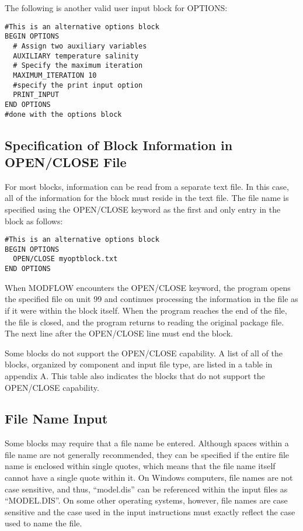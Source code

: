 \noindent The following is another valid user input block for OPTIONS:

\begin{lstlisting}[style=inputfile]
#This is an alternative options block
BEGIN OPTIONS
  # Assign two auxiliary variables
  AUXILIARY temperature salinity
  # Specify the maximum iteration
  MAXIMUM_ITERATION 10
  #specify the print input option
  PRINT_INPUT
END OPTIONS
#done with the options block
\end{lstlisting}

\subsection{Specification of Block Information in OPEN/CLOSE File} 
For most blocks, information can be read from a separate text file.  In this case, all of the information for the block must reside in the text file.  The file name is specified using the OPEN/CLOSE keyword as the first and only entry in the block as follows:

\begin{lstlisting}[style=inputfile]
#This is an alternative options block
BEGIN OPTIONS
  OPEN/CLOSE myoptblock.txt
END OPTIONS
\end{lstlisting}

\noindent When MODFLOW encounters the OPEN/CLOSE keyword, the program opens the specified file on unit 99 and continues processing the information in the file as if it were within the block itself.  When the program reaches the end of the file, the file is closed, and the program returns to reading the original package file.  The next line after the OPEN/CLOSE line must end the block.

Some blocks do not support the OPEN/CLOSE capability.  A list of all of the blocks, organized by component and input file type, are listed in a table in appendix A.  This table also indicates the blocks that do not support the OPEN/CLOSE capability.

\subsection{File Name Input}
Some blocks may require that a file name be entered.  Although spaces within a file name are not generally recommended, they can be specified if the entire file name is enclosed within single quotes, which means that the file name itself cannot have a single quote within it.  On Windows computers, file names are not case sensitive, and thus, ``model.dis'' can be referenced within the input files as ``MODEL.DIS''.  On some other operating systems, however, file names are case sensitive and the case used in the input instructions must exactly reflect the case used to name the file.

